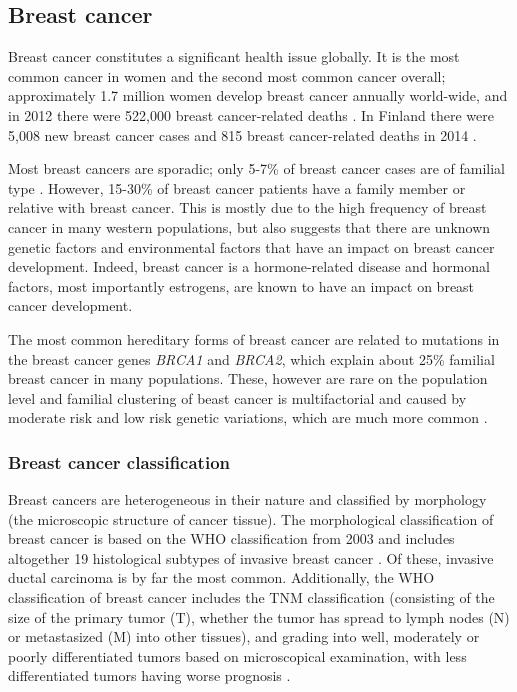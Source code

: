 \subsection{Breast cancer}\label{breast-cancer}

Breast cancer constitutes a significant health issue globally. It is the most
common cancer in women and the second most common cancer overall;
approximately 1.7 million women develop breast cancer annually world-wide, and
in 2012 there were 522,000 breast cancer-related deaths
\citep{Ferlay2015}. In Finland there were 5,008 new breast cancer cases
and 815 breast cancer-related deaths in 2014 \citep{Syoparekisteri}.

Most breast cancers are sporadic; only 5-7\% of breast cancer cases are of
familial type \citep{Melchor2013}. However, 15-30\% of breast cancer patients
have a family member or relative with breast cancer. This is
mostly due to the high frequency of breast cancer in many western populations,
but also suggests that there are unknown genetic factors and environmental
factors that have an impact on breast cancer development. Indeed, breast
cancer is a hormone-related disease and hormonal factors, most importantly estrogens,
are known to have an impact on breast cancer development.

The most common hereditary forms of breast cancer are related to mutations in
the breast cancer genes \emph{BRCA1} and \emph{BRCA2}, which explain about 25\% familial
breast cancer in many populations. These, however are rare on the population
level and familial clustering of beast cancer is multifactorial and caused by
moderate risk and low risk genetic variations, which are much more common
\citep{Melchor2013}.




\subsubsection{Breast cancer classification}\label{breast-cancer-classification}

Breast cancers are heterogeneous in their nature and classified by morphology
(the microscopic structure of cancer tissue).
The morphological classification of breast cancer is based on the WHO
classification from 2003 and includes altogether 19 histological subtypes of
invasive breast cancer \citep{Tavassoli2003,Weigelt2009}. Of these, invasive
ductal carcinoma is by far the most common. Additionally, the WHO
classification of breast cancer includes the TNM classification (consisting of
the size of the primary tumor (T), whether the tumor has spread to
lymph nodes (N) or metastasized (M) into other tissues), and grading
into well, moderately or poorly differentiated tumors based on
microscopical examination,
with less differentiated tumors having worse prognosis \citep{Tavassoli2003}.

